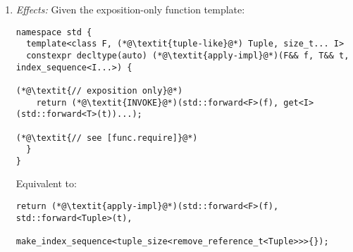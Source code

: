 \documentclass{article}
\begin{document}
\begin{enumerate}
\item \textit{Effects:} Given the exposition-only function template:

\begin{lstlisting}[style=base]
namespace std {
  template<class F, (*@\textit{tuple-like}@*) Tuple, size_t... I>
  constexpr decltype(auto) (*@\textit{apply-impl}@*)(F&& f, T&& t, index_sequence<I...>) {
                                                                  (*@\textit{// exposition only}@*)
    return (*@\textit{INVOKE}@*)(std::forward<F>(f), get<I>(std::forward<T>(t))...);
                                                                  (*@\textit{// see [func.require]}@*)
  }
}
\end{lstlisting}

Equivalent to:

\begin{lstlisting}[style=base]
  return (*@\textit{apply-impl}@*)(std::forward<F>(f), std::forward<Tuple>(t),
                  make_index_sequence<tuple_size<remove_reference_t<Tuple>>>{});
\end{lstlisting}

\end{enumerate}
\end{document}
